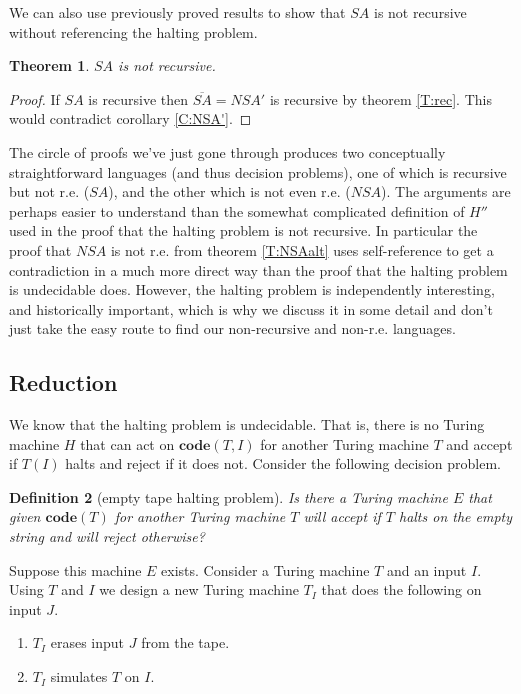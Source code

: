 \documentclass{article}
\theoremstyle{plain}
\newtheorem{theorem}{Theorem}[section]{\bfseries}{\itshape}
\newtheorem{definition}[theorem]{Definition}{\bfseries}{\upshape}
\theoremstyle{definition}
\newcommand{\co}{\mathbf{code}}
\begin{document}
We can also use previously proved results to show that $SA$ is not recursive without referencing the halting problem.
\begin{theorem}
$SA$ is not recursive.
\end{theorem}
\begin{proof}
If $SA$ is recursive then $\overline{SA}=NSA'$ is recursive by theorem \ref{T:rec}. This would contradict corollary \ref{C:NSA'}.
\end{proof}

The circle of proofs we've just gone through produces two conceptually straightforward languages (and thus decision problems), one of which is recursive but not r.e. ($SA$), and the other which is not even r.e. ($NSA$). The arguments are perhaps easier to understand than the somewhat complicated definition of $H''$ used in the proof that the halting problem is not recursive. In particular the proof that $NSA$ is not r.e. from theorem \ref{T:NSAalt} uses self-reference to get a contradiction in a much more direct way than the proof that the halting problem is undecidable does. However, the halting problem is independently interesting, and historically important, which is why we discuss it in some detail and don't just take the easy route to find our non-recursive and non-r.e. languages. 


\subsection{Reduction}
We know that the halting problem is undecidable. That is, there is no Turing machine $H$ that can act on $\co(T,I)$ for another Turing machine $T$ and accept if $T(I)$ halts and reject if it does not. Consider the following decision problem.

\begin{definition}[empty tape halting problem]
Is there a Turing machine $E$ that given $\co(T)$ for another Turing machine $T$ will accept if $T$ halts on the empty string and will reject otherwise?
\end{definition}

Suppose this machine $E$ exists. Consider a Turing machine $T$ and an input $I$. Using $T$ and $I$ we design a new Turing machine $T_I$ that does the following on input $J$.
\begin{enumerate}
\item $T_I$ erases input $J$ from the tape.
\item $T_I$ simulates $T$ on $I$.
\end{enumerate}
\end{document}

